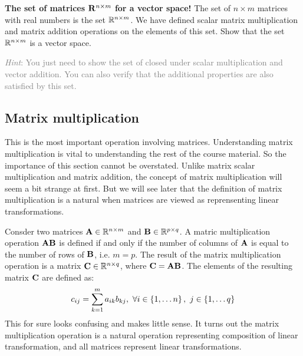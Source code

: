 \begin{boxedstuff}
    \begin{problem}
        \textbf{The set of matrices $\mathbf{R}^{n\times m}$ for a vector space!} The set of $n \times m$ matrices with real numbers is the set $\mathbb{R}^{n \times m}$. We have defined scalar matrix multiplication and matrix addition operations on the elements of this set. Show that the set $\mathbb{R}^{n \times m}$ is a vector space. 
        
        \noindent\begin{small}\textcolor{gray}{\textit{Hint}: You just need to show the set of closed under scalar multiplication and vector addition. You can also verify that the additional properties are also satisfied by this set.}\end{small}
    \end{problem}
\end{boxedstuff}

\subsection{Matrix multiplication}
This is the most important operation involving matrices. Understanding matrix multiplication is vital to understanding the rest of the course material. So the importance of this section cannot be overstated. Unlike matrix scalar multiplication and matrix addition, the concept of matrix multiplication will seem a bit strange at first. But we will see later that the definition of matrix multiplication is a natural when matrices are viewed as reprensenting linear transformations. 

Consder two matrices $\mathbf{A} \in \mathbb{R}^{n \times m}$ and $\mathbf{B} \in \mathbb{R}^{p \times q}$. A matric multiplication operation $\mathbf{A}\mathbf{B}$ is defined if and only if the number of columns of $\mathbf{A}$ is equal to the number of rows of $\mathbf{B}$, i.e. $m = p$. The result of the matrix multiplication operation is a matrix $\mathbf{C} \in \mathbb{R}^{n \times q}$, where $\mathbf{C} = \mathbf{A}\mathbf{B}$. The elements of the resulting matrix $\mathbf{C}$ are defined as:
\begin{equation}
    c_{ij} = \sum_{k=1}^{m} a_{ik}b_{kj}, \,\, \forall i \in \left\{ 1, \ldots n\right\}, \,\, j \in \left\{ 1, \ldots q\right\}
    \label{eq:ch02-mat-mult-ip}
\end{equation}
This for sure looks confusing and makes little sense. It turns out the matrix multiplication operation is a natural operation representing composition of linear transformation, and all matrices represent linear transformations. 

